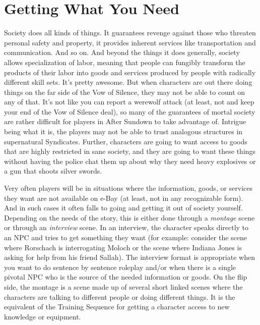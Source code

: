 \chapter{Getting What You Need}

Society does all kinds of things. It guarantees revenge against those who threaten personal safety and property, it provides inherent services like transportation and communication. And so on. And beyond the things it does generally, society allows specialization of labor, meaning that people can fungibly transform the products of their labor into goods and services produced by people with radically different skill sets. It's pretty awesome. But when characters are out there doing things on the far side of the Vow of Silence, they may not be able to count on any of that. It's not like you can report a werewolf attack (at least, not and keep your end of the Vow of Silence deal), so many of the guarantees of mortal society are rather difficult for players in After Sundown to take advantage of. Intrigue being what it is, the players may not be able to trust analogous structures in supernatural Syndicates. Further, characters are going to want access to goods that are highly restricted in sane society, and they are going to want these things without having the police chat them up about why they need heavy explosives or a gun that shoots silver swords.

Very often players will be in situations where the information, goods, or services they want are not available on e-Bay (at least, not in any recognizable form). And in such cases it often falls to going and getting it out of society yourself. Depending on the needs of the story, this is either done through a \textit{montage} scene or through an \textit{interview} scene. In an interview, the character speaks directly to an NPC and tries to get something they want (for example: consider the scene where Rorschach is interrogating Moloch or the scene where Indiana Jones is asking for help from his friend Sallah). The interview format is appropriate when you want to do sentence by sentence roleplay and/or when there is a single pivotal NPC who is the source of the needed information or goods. On the flip side, the montage is a scene made up of several short linked scenes where the characters are talking to different people or doing different things. It is the equivalent of the Training Sequence for getting a character access to new knowledge or equipment.


